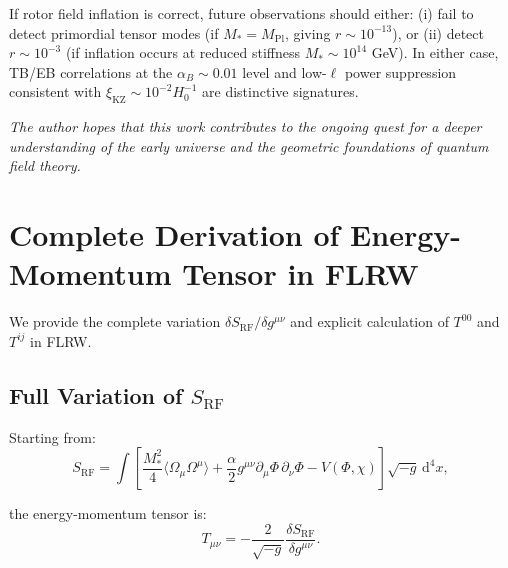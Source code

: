 \documentclass[11pt,a4paper]{article}
\numberwithin{equation}{section}
\theoremstyle{plain}
\theoremstyle{definition}
\theoremstyle{remark}
\newcommand{\dd}{\mathrm{d}}
\newif\ifack
\begin{document}
If rotor field inflation is correct, future observations should either: (i) fail to detect primordial tensor modes (if $M_* = M_{\mathrm{Pl}}$, giving $r \sim 10^{-13}$), or (ii) detect $r \sim 10^{-3}$ (if inflation occurs at reduced stiffness $M_* \sim 10^{14}$ GeV). In either case, TB/EB correlations at the $\alpha_B \sim 0.01$ level and low-$\ell$ power suppression consistent with $\xi_{\mathrm{KZ}} \sim 10^{-2}H_0^{-1}$ are distinctive signatures.

\medskip
\noindent\textit{The author hopes that this work contributes to the ongoing quest for a deeper understanding of the early universe and the geometric foundations of quantum field theory.}

\ifack
\section*{Acknowledgements}
The author is indebted to the pioneering work of David Hestenes, Anthony Lasenby, and Chris Doran in developing geometric algebra as a language for physics. Thanks are due to the Planck, BICEP/Keck, and LIGO collaborations for making data publicly available. This work was conducted independently without external funding.
\fi

\appendix

\section{Complete Derivation of Energy-Momentum Tensor in FLRW}
\label{app:stress}

We provide the complete variation $\delta S_{\mathrm{RF}}/\delta g^{\mu\nu}$ and explicit calculation of $T^{00}$ and $T^{ij}$ in FLRW.

\subsection{Full Variation of $S_{\mathrm{RF}}$}

Starting from:
\begin{equation}
S_{\mathrm{RF}} = \int \left[\frac{M_*^2}{4}\langle \Omega_\mu \Omega^\mu \rangle + \frac{\alpha}{2}g^{\mu\nu}\partial_\mu\Phi\,\partial_\nu\Phi - V(\Phi,\chi)\right] \sqrt{-g}\, \dd^4x,
\end{equation}

the energy-momentum tensor is:
\begin{equation}
T_{\mu\nu} = -\frac{2}{\sqrt{-g}}\frac{\delta S_{\mathrm{RF}}}{\delta g^{\mu\nu}}.
\end{equation}
\end{document}
